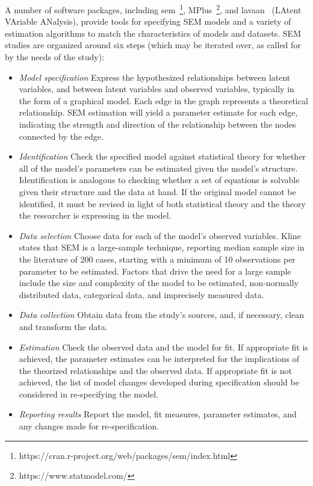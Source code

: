 A number of software packages, including sem~\footnote{https://cran.r-project.org/web/packages/sem/index.html}, MPlus~\footnote{https://www.statmodel.com/}, and lavaan~\cite{roseel2012lavaan} (LAtent VAriable ANalysis), provide tools for specifying SEM models and a variety of estimation algorithms to match the characteristics of models and datasets. 
SEM studies are organized around six steps (which may be iterated over, as called for by the needs of the study): 
\begin{itemize}
\item \textit{Model specification} Express the hypothesized relationships between latent variables, and between latent variables and observed variables, typically in the form of a graphical model. Each edge in the graph represents a theoretical relationship. SEM estimation will yield a parameter estimate for each edge, indicating the strength and direction of the relationship between the nodes connected by the edge.

\item \textit{Identification} 
Check the specified model against statistical theory for whether all of the model’s parameters can be estimated given the model's structure. Identification is analogous to checking whether a set of equations is solvable given their structure and the data at hand. If the original model cannot be identified, it must be revised in light of both statistical theory and the theory the researcher is expressing in the model.

\item \textit{Data selection}
Choose data for each of the model’s observed variables. Kline ~\cite{kline2015principles} states that SEM is a large-sample technique, reporting median sample size in the literature of 200 cases, starting with a minimum of 10 observations per parameter to be estimated.  Factors that drive the need for a large sample include the size and complexity of the model to be estimated, non-normally distributed data, categorical data, and imprecisely measured data.

\item \textit{Data collection}
Obtain data from the study's sources, and, if necessary, clean and transform the data.

\item \textit{Estimation}
Check the observed data and the model for fit.  If appropriate fit is achieved, the parameter estimates can be interpreted for the implications of the theorized relationships and the observed data. If appropriate fit is not achieved, the list of model changes developed during specification should be considered in re-specifying the model.

\item \textit{Reporting results}
Report the model, fit measures, parameter estimates, and any changes made for re-specification.
\end{itemize}

